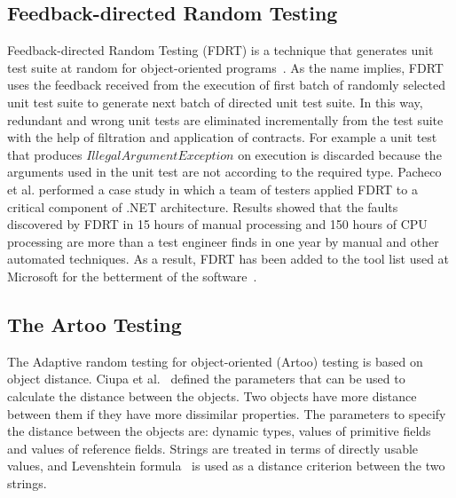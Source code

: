 
\subsection{Feedback-directed Random Testing}
Feedback-directed Random Testing (FDRT) is a technique that generates unit test suite at random for object-oriented programs~\cite{pacheco2007randoop}. As the name implies, FDRT uses the feedback received from the execution of first batch of randomly selected unit test suite to generate next batch of directed unit test suite. In this way, redundant  and wrong unit tests are eliminated incrementally from the test suite with the help of filtration and application of contracts. For example a unit test that produces $IllegalArgumentException$ on execution is discarded because the arguments used in the unit test are not according to the required type. Pacheco et al. performed a case study in which a team of testers applied FDRT to a critical component of .NET architecture. Results showed that the faults discovered by FDRT in 15 hours of manual processing and 150 hours of CPU processing are more than a test engineer finds in one year by manual and other automated techniques. As a result, FDRT has been added to the tool list used at Microsoft for the betterment of the software~\cite{pacheco2008finding}. 



\subsection{The Artoo Testing}
The Adaptive random testing for object-oriented (Artoo) testing is based on object distance. Ciupa et al.~\cite{ciupa2006object} defined the parameters that can be used to calculate the distance between the objects. Two objects have more distance between them if they have more dissimilar properties. The parameters to specify the distance between the objects are: dynamic types, values of primitive fields and values of reference fields. Strings are treated in terms of directly usable values, and Levenshtein formula~\cite{levenshtein1966binary} is used as a distance criterion between the two strings.

